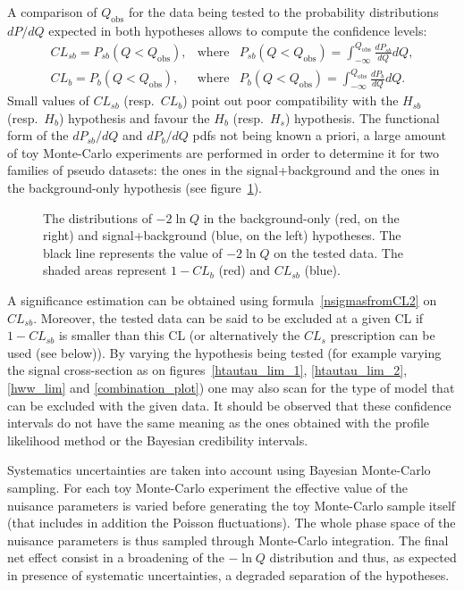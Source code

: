 \documentclass[11pt]{article}
\begin{document}
A comparison of $Q_\mathrm{obs}$ for the data being tested to the
probability distributions $dP/dQ$ expected in both hypotheses allows
to compute the confidence levels:
\begin{eqnarray}
  CL_{sb} = P_{sb}(Q<Q_\mathrm{obs}), & \mathrm{where} & P_{sb}(Q<Q_\mathrm{obs}) = \int_{-\infty}^{Q_\mathrm{obs}}\frac{dP_{sb}}{dQ} dQ, \\
  CL_{b} = P_{b}(Q<Q_\mathrm{obs}), & \mathrm{where} & P_{b}(Q<Q_\mathrm{obs}) = \int_{-\infty}^{Q_\mathrm{obs}}\frac{dP_{b}}{dQ} dQ.
\end{eqnarray}
Small values of $CL_{sb}$ (resp.~$CL_{b}$) point out poor compatibility with the $H_{sb}$ (resp.~$H_{b}$)
hypothesis and favour the $H_{b}$ (resp.~$H_{s}$) hypothesis.
The functional form of the $dP_{sb}/dQ$ and $dP_{b}/dQ$ pdfs not being
known a priori, a large amount of toy Monte-Carlo experiments are performed
in order to determine it for
two families of pseudo datasets: the ones in the signal+background and the ones in the background-only hypothesis (see figure~\ref{m2lnQ}).


\begin{figure}[h]
    \begin{center}
        \caption{The distributions of $-2\ln Q$ in the background-only
                 (red, on the right) and signal+background (blue,
                 on the left) hypotheses. The black line represents
                 the value of $-2\ln Q$ on the tested data.  The
                 shaded areas represent $1-CL_{b}$ (red) and $CL_{sb}$
                 (blue).\label{m2lnQ}}
    \end{center}
\end{figure}

A significance estimation can be obtained using formula~\ref{nsigmasfromCL2} on
$CL_{sb}$. Moreover, the tested data can be said to be excluded at a
given CL if $1-CL_{sb}$ is smaller than this CL (or alternatively the
$CL_s$ prescription can be used (see below)). By varying the
hypothesis being tested (for example varying the signal cross-section
as on figures~\ref{htautau_lim_1}, \ref{htautau_lim_2}, \ref{hww_lim}
and \ref{combination_plot}) one may also scan for the type of model
that can be excluded with the given data.
It should be observed that these confidence intervals do not have the
same meaning as the ones obtained with the profile likelihood method
or the Bayesian credibility intervals.
\par
Systematics uncertainties are taken into account  using Bayesian
Monte-Carlo sampling.
For each toy Monte-Carlo experiment the effective value 
of the nuisance parameters is varied before generating the toy Monte-Carlo sample itself 
(that includes in addition the Poisson fluctuations).
The whole phase space of the nuisance parameters is thus sampled through
Monte-Carlo integration. The final net effect consist in a broadening
of the $-\ln Q$ distribution and thus, as expected in presence of
systematic uncertainties, a degraded separation of the hypotheses.
\end{document}

